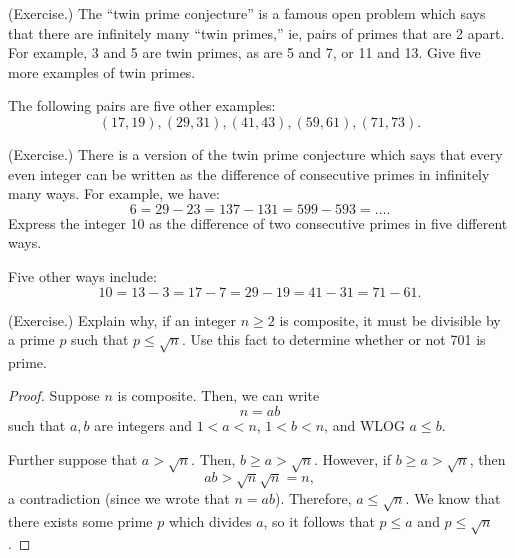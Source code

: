 \documentclass[letterpaper]{article}
\begin{document}
\begin{mdframed}
    (Exercise.) The ``twin prime conjecture'' is a famous open problem which says that there are infinitely many “twin primes,” ie, pairs of primes that are 2 apart. For example, 3 and 5 are twin primes, as are 5 and 7, or 11 and 13. Give five more examples of twin primes.
    
    \begin{mdframed}
        The following pairs are five other examples:
        \[(17, 19), (29, 31), (41, 43), (59, 61), (71, 73).\]
    \end{mdframed}
\end{mdframed}

\begin{mdframed}
    (Exercise.) There is a version of the twin prime conjecture which says that every even integer can be written as the difference of consecutive primes in infinitely many ways. For example, we have: \[6 = 29 - 23 = 137 - 131 = 599 - 593 = \hdots.\]
    Express the integer 10 as the difference of two consecutive primes in five different ways.
    \begin{mdframed}
        Five other ways include: 
        \[10 = 13 - 3 = 17 - 7 = 29 - 19 = 41 - 31 = 71 - 61.\]
    \end{mdframed}
\end{mdframed}

\begin{mdframed}
    (Exercise.) Explain why, if an integer $n \geq 2$ is composite, it must be divisible by a prime $p$ such that $p \leq \sqrt{n}$. Use this fact to determine whether or not 701 is prime. 

    \begin{mdframed}
        \begin{proof}
            Suppose $n$ is composite. Then, we can write \[n = ab\] such that $a, b$ are integers and $1 < a < n$, $1 < b < n$, and WLOG $a \leq b$.
            
            \bigskip 
            
            Further suppose that $a > \sqrt{n}$. Then, $b \geq a > \sqrt{n}$. However, if $b \geq a > \sqrt{n}$, then \[ab > \sqrt{n}\sqrt{n} = n,\] a contradiction (since we wrote that $n = ab$). Therefore, $a \leq \sqrt{n}.$ We know that there exists some prime $p$ which divides $a$, so it follows that $p \leq a$ and $p \leq \sqrt{n}$.  
        \end{proof}
    \end{mdframed}
\end{mdframed}
\end{document}

